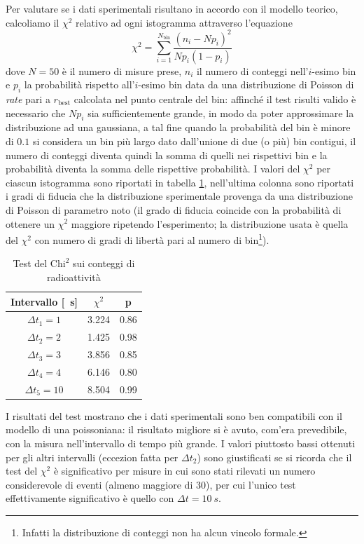 \documentclass[10pt,oneside,a4paper]{article}
\begin{document}
Per valutare se i dati sperimentali risultano in accordo con il modello teorico, calcoliamo il $\chi^2$ relativo ad ogni istogramma attraverso l'equazione
\begin{equation}\label{eq:chi2}
	\chi^2 = \sum_{i=1}^{N_\mathrm{bin}} \frac{(n_i - N p_i)^2}{N p_i ( 1 - p_i)}
\end{equation}
dove $N = 50$ è il numero di misure prese, $n_i$ il numero di conteggi nell'$i$-esimo bin e $p_i$ la probabilità rispetto all'$i$-esimo bin data da una distribuzione di Poisson di \emph{rate} pari a $r_{\mathrm{best}}$ calcolata nel punto centrale del bin: affinché il test risulti valido è necessario che $Np_i$ sia sufficientemente grande, in modo da poter approssimare la distribuzione ad una gaussiana, a tal fine quando la probabilità del bin è minore di $0.1$ si considera un bin più largo dato dall'unione di due (o più) bin contigui, il numero di conteggi diventa quindi la somma di quelli nei rispettivi bin e la probabilità diventa la somma delle rispettive probabilità. I valori del $\chi^2$ per ciascun istogramma sono riportati in tabella \ref{tab:chi2}, nell'ultima colonna sono riportati i gradi di fiducia che la distribuzione sperimentale provenga da una distribuzione di Poisson di parametro noto (il grado di fiducia coincide con la probabilità di ottenere un $\chi^2$ maggiore ripetendo l'esperimento; la distribuzione usata è quella del $\chi^2$ con numero di gradi di libertà pari al numero di bin\footnote{Infatti la distribuzione di conteggi non ha alcun vincolo formale.}).
\begin{table}[t]
\caption{Test del $\mathrm{Chi}^2$ sui conteggi di radioattività}
\label{tab:chi2}
\centering
\begin{tabular}{ccc}
\toprule
Intervallo [\SI{}{s}] & $\chi^2$ & p\\
\hline 
$\Delta t_1 = 1$ &  3.224 & 0.86\\  %
$\Delta t_2 = 2$ & 1.425 & 0.98\\
$\Delta t_3 = 3$ & 3.856 & 0.85\\
$\Delta t_4 = 4$ & 6.146 & 0.80\\
$\Delta t_5 = 10$ & 8.504 & 0.99\\
\bottomrule
\end{tabular}
\end{table}

I risultati del test mostrano che i dati sperimentali sono ben compatibili con il modello di una poissoniana: il risultato migliore si è avuto, com'era prevedibile, con la misura nell'intervallo di tempo più grande. I valori piuttosto bassi ottenuti per gli altri intervalli (eccezion fatta per $\Delta t_2$) sono giustificati se si ricorda che il test del $\chi^2$ è significativo per misure in cui sono stati rilevati un numero considerevole di eventi (almeno maggiore di 30), per cui l'unico test effettivamente significativo è quello con $\Delta t = \SI{10}{s}$. 
\end{document}

